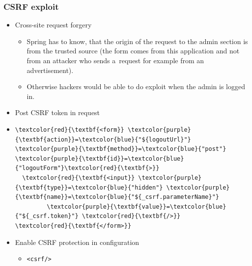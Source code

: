 \documentclass[10pt,xcolor=pdflatex, table]{beamer}
\begin{document}
\begin{frame}[fragile]\frametitle{CSRF exploit}
	\begin{itemize}
		\item Cross-site request forgery
          \begin{itemize}
        	\item Spring has to know, that the origin of the request to the admin section is from the trusted source (the form comes from this application and not from an attacker who sends a~request for example from an advertisement).
        	\item Otherwise hackers would be able to do exploit when the admin is logged in.
          \end{itemize}
        \medskip
		\item Post CSRF token in request
        \item[]
        	\medskip
			\begin{Verbatim}[fontsize=\footnotesize, commandchars=\\\{\}]  
\textcolor{red}{\textbf{<form}} \textcolor{purple}{\textbf{action}}=\textcolor{blue}{"${logoutUrl}"} \textcolor{purple}{\textbf{method}}=\textcolor{blue}{"post"} \textcolor{purple}{\textbf{id}}=\textcolor{blue}{"logoutForm"}\textcolor{red}{\textbf{>}}
  \textcolor{red}{\textbf{<input}} \textcolor{purple}{\textbf{type}}=\textcolor{blue}{"hidden"} \textcolor{purple}{\textbf{name}}=\textcolor{blue}{"${_csrf.parameterName}"}
         \textcolor{purple}{\textbf{value}}=\textcolor{blue}{"${_csrf.token}"} \textcolor{red}{\textbf{/>}}
\textcolor{red}{\textbf{</form>}}
            \end{Verbatim}
        \medskip
		\item Enable CSRF protection in configuration
          \begin{itemize}
            \item \verb+<csrf/>+
          \end{itemize}
	\end{itemize}
\end{frame}
\end{document}

